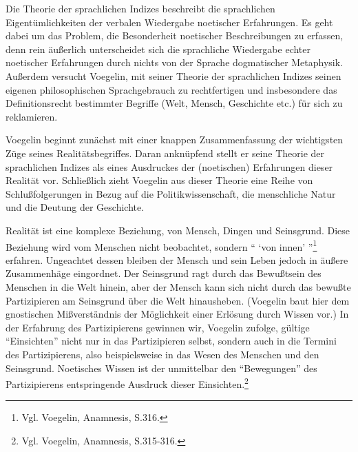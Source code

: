 Die Theorie der sprachlichen Indizes beschreibt die sprachlichen
Eigentümlichkeiten der verbalen Wiedergabe noetischer Erfahrungen. Es geht
dabei um das Problem, die Besonderheit noetischer Beschreibungen zu erfassen,
denn rein äußerlich unterscheidet sich die sprachliche Wiedergabe echter
noetischer Erfahrungen durch nichts von der Sprache dogmatischer Metaphysik.
Außerdem versucht Voegelin, mit seiner Theorie der sprachlichen Indizes seinen
eigenen philosophischen Sprachgebrauch zu rechtfertigen und insbesondere das
Definitionsrecht bestimmter Begriffe (Welt, Mensch, Geschichte etc.) für sich
zu reklamieren.

Voegelin beginnt zunächst mit einer knappen Zusammenfassung der wichtigsten
Züge seines Realitätsbegriffes. Daran anknüpfend stellt er seine Theorie der
sprachlichen Indizes als eines Ausdruckes der (noetischen) Erfahrungen dieser
Realität vor. Schließlich zieht Voegelin aus dieser Theorie eine Reihe von
Schlußfolgerungen in Bezug auf die Politikwissenschaft, die menschliche Natur
und die Deutung der Geschichte.

Realität ist eine komplexe Beziehung, von Mensch, Dingen und Seinsgrund. Diese
Beziehung wird vom Menschen nicht beobachtet, sondern "` `von innen'
"'\footnote{Vgl. Voegelin, Anamnesis, S.316.} erfahren. Ungeachtet dessen
bleiben der Mensch und sein Leben jedoch in äußere Zusammenhäge eingordnet.
Der Seinsgrund ragt durch das Bewußtsein des Menschen in die Welt hinein, aber
der Mensch kann sich nicht durch das bewußte Partizipieren am Seinsgrund über
die Welt hinausheben. (Voegelin baut hier dem gnostischen Mißverständnis der
Möglichkeit einer Erlösung durch Wissen vor.)  In der Erfahrung des
Partizipierens gewinnen wir, Voegelin zufolge, gültige "`Einsichten"' nicht
nur in das Partizipieren selbst, sondern auch in die Termini des
Partizipierens, also beispielsweise in das Wesen des Menschen und den
Seinsgrund. Noetisches Wissen ist der unmittelbar den "`Bewegungen"' des
Partizipierens entspringende Ausdruck dieser Einsichten.\footnote{Vgl.
  Voegelin, Anamnesis, S.315-316.}

